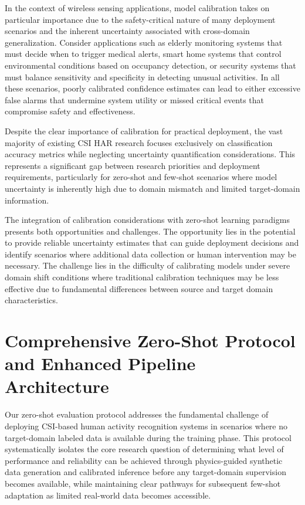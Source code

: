 \documentclass[journal]{IEEEtran}
\begin{document}
In the context of wireless sensing applications, model calibration takes on particular importance due to the safety-critical nature of many deployment scenarios and the inherent uncertainty associated with cross-domain generalization. Consider applications such as elderly monitoring systems that must decide when to trigger medical alerts, smart home systems that control environmental conditions based on occupancy detection, or security systems that must balance sensitivity and specificity in detecting unusual activities. In all these scenarios, poorly calibrated confidence estimates can lead to either excessive false alarms that undermine system utility or missed critical events that compromise safety and effectiveness.

Despite the clear importance of calibration for practical deployment, the vast majority of existing CSI HAR research focuses exclusively on classification accuracy metrics while neglecting uncertainty quantification considerations. This represents a significant gap between research priorities and deployment requirements, particularly for zero-shot and few-shot scenarios where model uncertainty is inherently high due to domain mismatch and limited target-domain information.

The integration of calibration considerations with zero-shot learning paradigms presents both opportunities and challenges. The opportunity lies in the potential to provide reliable uncertainty estimates that can guide deployment decisions and identify scenarios where additional data collection or human intervention may be necessary. The challenge lies in the difficulty of calibrating models under severe domain shift conditions where traditional calibration techniques may be less effective due to fundamental differences between source and target domain characteristics.

\section{Comprehensive Zero-Shot Protocol and Enhanced Pipeline Architecture}

Our zero-shot evaluation protocol addresses the fundamental challenge of deploying CSI-based human activity recognition systems in scenarios where no target-domain labeled data is available during the training phase. This protocol systematically isolates the core research question of determining what level of performance and reliability can be achieved through physics-guided synthetic data generation and calibrated inference before any target-domain supervision becomes available, while maintaining clear pathways for subsequent few-shot adaptation as limited real-world data becomes accessible.
\end{document}

